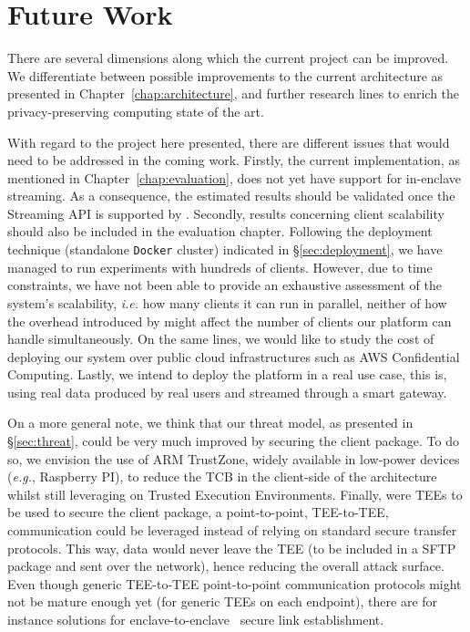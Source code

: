 \chapter{Future Work} \label{chap:future-work}

There are several dimensions along which the current project can be improved. 
We differentiate between possible improvements to the current architecture as presented in Chapter~\ref{chap:architecture}, and further research lines to enrich the privacy-preserving computing state of the art.

With regard to the project here presented, there are different issues that would need to be addressed in the coming work.
Firstly, the current \sgxspark implementation, as mentioned in Chapter~\ref{chap:evaluation}, does not yet have support for in-enclave streaming.
As a consequence, the estimated results should be validated once the Streaming API is supported by \sgxspark.
Secondly, results concerning client scalability should also be included in the evaluation chapter.
Following the deployment technique (standalone \texttt{Docker} cluster) indicated in \S\ref{sec:deployment}, we have managed to run experiments with hundreds of clients.
However, due to time constraints, we have not been able to provide an exhaustive assessment of the system's scalability, \textit{i.e.} how many clients it can run in parallel, neither of how the overhead introduced by \sgxspark might affect the number of clients our platform can handle simultaneously.
On the same lines, we would like to study the cost of deploying our system over public cloud infrastructures such as AWS Confidential Computing.
Lastly, we intend to deploy the platform in a real use case, this is, using real data produced by real users and streamed through a smart gateway.

On a more general note, we think that our threat model, as presented in \S\ref{sec:threat}, could be very much improved by securing the client package.
To do so, we envision the use of ARM TrustZone, widely available in low-power devices (\textit{e.g.}, Raspberry PI), to reduce the TCB in the client-side of the architecture whilst still leveraging on Trusted Execution Environments.
Finally, were TEEs to be used to secure the client package, a point-to-point, TEE-to-TEE, communication could be leveraged instead of relying on standard secure transfer protocols.
This way, data would never leave the TEE (to be included in a SFTP package and sent over the network), hence reducing the overall attack surface.
Even though generic TEE-to-TEE point-to-point communication protocols might not be mature enough yet (for generic TEEs on each endpoint), there are for instance solutions for enclave-to-enclave~\cite{Aublin2017} secure link establishment.
